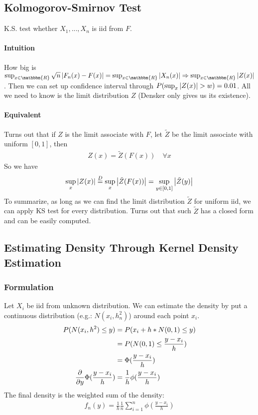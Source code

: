 \subsection{Kolmogorov-Smirnov Test} 
K.S. test whether $X_1, ..., X_n$ is iid from $F$.

\paragraph{Intuition} How big is $\sup_{x\in \mathbbm{R}} \sqrt{n}\abs{F_n(x) - F(x)} = \sup_{x\in \mathbbm{R}}\abs{X_n(x)} \Rightarrow \sup_{x\in\mathbbm{R}}\abs{Z(x)}$. Then we can set up confidence interval through $P(\sup_{x} \left| Z(x) \right| > w) = 0.01$. All we need to know is the limit distribution $Z$ (Densker only gives us its existence). 

\paragraph{Equivalent} Turns out that if $Z$ is the limit associate with $F$, let $\tilde{Z}$ be the limit associate with uniform $[0,1]$, then 
    \begin{align*}
        Z(x) = \tilde{Z}(F(x)) \quad \forall x
    \end{align*}
So we have 
    \begin{align*}
        \sup_x \left| Z(x) \right| \overset{D}{=} \sup_x \left| \tilde{Z}(F(x)) \right| = \sup_{y \in [0,1]}\left| \tilde{Z}(y) \right|
    \end{align*}
To summarize, as long as we can find the limit distribution $\tilde{Z}$ for uniform iid, we can apply KS test for every distribution. Turns out that such $\tilde{Z}$ has a closed form and can be easily computed. 


\subsection{Estimating Density Through Kernel Density Estimation}
\subsubsection{Formulation}
Let $X_i$ be iid from unknown distribution. We can estimate the density by put a continuous distribution (e.g.: $N(x_i, h_n^2)$) around each point $x_i$. 
    \begin{align*}
        P(N(x_i, h^2) \leq y)
        & = P(x_i + h * N(0,1) \leq y) \\
        & = P(N(0,1) \leq \frac{y - x_i}{h}) \\
        & = \Phi(\frac{y - x_i}{h}) \\
        \frac{\partial}{\partial y}\Phi(\frac{y - x_i}{h}) 
        & = \frac{1}{h}\phi(\frac{y-x_i}{h})
    \end{align*}
The final density is the weighted sum of the density: 
    \begin{align*}
        f_n(y) = \frac{1}{h} \frac{1}{n} \sum_{i=1}^n \phi(\frac{y-x_i}{h}) 
    \end{align*}


